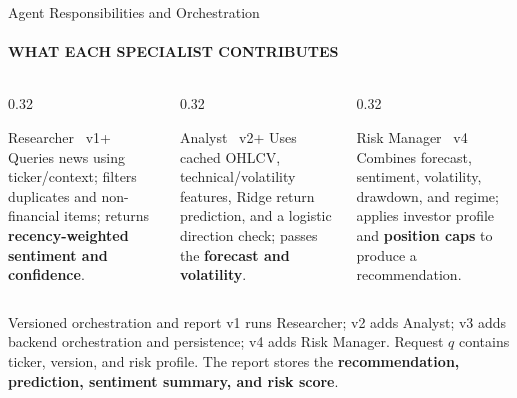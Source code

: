 \documentclass[aspectratio=169,11pt]{beamer}
\newcommand{\keyphrase}[1]{\textbf{\color{DELCONred}#1}}
\begin{document}
\begin{frame}{Agent Responsibilities and Orchestration}
  \framesubtitle{WHAT EACH SPECIALIST CONTRIBUTES}
  \begin{columns}[T,onlytextwidth]
    \begin{column}{0.32\textwidth}
      \begin{block}{Researcher \textbullet\ v1+}
        \small Queries news using ticker/context; filters duplicates and non-financial items; returns \keyphrase{recency-weighted sentiment and confidence}.
      \end{block}
    \end{column}
    \begin{column}{0.32\textwidth}
      \begin{block}{Analyst \textbullet\ v2+}
        \small Uses cached OHLCV, technical/volatility features, Ridge return prediction, and a logistic direction check; passes the \keyphrase{forecast and volatility}.
      \end{block}
    \end{column}
    \begin{column}{0.32\textwidth}
      \begin{block}{Risk Manager \textbullet\ v4}
        \small Combines forecast, sentiment, volatility, drawdown, and regime; applies investor profile and \keyphrase{position caps} to produce a recommendation.
      \end{block}
    \end{column}
  \end{columns}
  \vspace{0.1cm}
  \begin{block}{Versioned orchestration and report}
    \small v1 runs Researcher; v2 adds Analyst; v3 adds backend orchestration and persistence; v4 adds Risk Manager. Request $q$ contains ticker, version, and risk profile. The report stores the \keyphrase{recommendation, prediction, sentiment summary, and risk score}.
  \end{block}
\end{frame}
\end{document}
